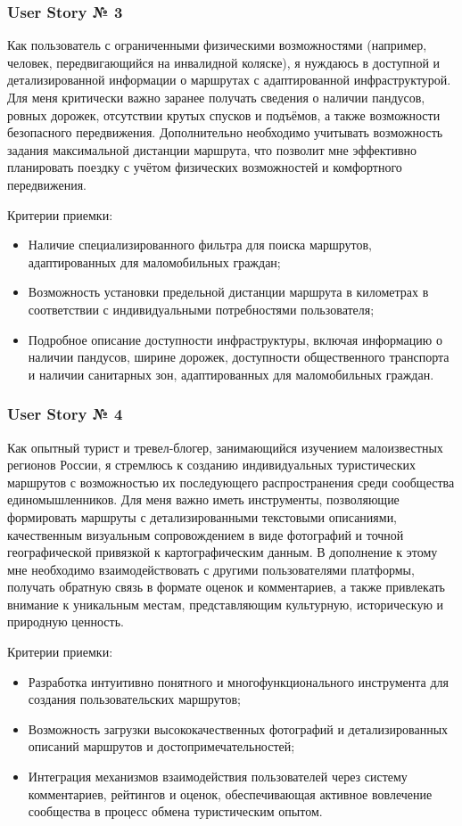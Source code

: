 \subsubsection*{User Story № 3} 
Как пользователь с ограниченными физическими возможностями (например, человек, передвигающийся на инвалидной коляске), я нуждаюсь в доступной и детализированной информации о маршрутах с адаптированной инфраструктурой. Для меня критически важно заранее получать сведения о наличии пандусов, ровных дорожек, отсутствии крутых спусков и подъёмов, а также возможности безопасного передвижения. Дополнительно необходимо учитывать возможность задания максимальной дистанции маршрута, что позволит мне эффективно планировать поездку с учётом физических возможностей и комфортного передвижения.

Критерии приемки:
\begin{itemize}
    \item 	Наличие специализированного фильтра для поиска маршрутов, адаптированных для маломобильных граждан;
    \item 	Возможность установки предельной дистанции маршрута в километрах в соответствии с индивидуальными потребностями пользователя;
    \item 	Подробное описание доступности инфраструктуры, включая информацию о наличии пандусов, ширине дорожек, доступности общественного транспорта и наличии санитарных зон, адаптированных для маломобильных граждан.
\end{itemize}

\subsubsection*{User Story № 4} 
Как опытный турист и тревел-блогер, занимающийся изучением малоизвестных регионов России, я стремлюсь к созданию индивидуальных туристических маршрутов с возможностью их последующего распространения среди сообщества единомышленников. Для меня важно иметь инструменты, позволяющие формировать маршруты с детализированными текстовыми описаниями, качественным визуальным сопровождением в виде фотографий и точной географической привязкой к картографическим данным. В дополнение к этому мне необходимо взаимодействовать с другими пользователями платформы, получать обратную связь в формате оценок и комментариев, а также привлекать внимание к уникальным местам, представляющим культурную, историческую и природную ценность.

Критерии приемки:
\begin{itemize}
    \item 	Разработка интуитивно понятного и многофункционального инструмента для создания пользовательских маршрутов;
    \item 	Возможность загрузки высококачественных фотографий и детализированных описаний маршрутов и достопримечательностей;
    \item 	Интеграция механизмов взаимодействия пользователей через систему комментариев, рейтингов и оценок, обеспечивающая активное вовлечение сообщества в процесс обмена туристическим опытом.
\end{itemize}

